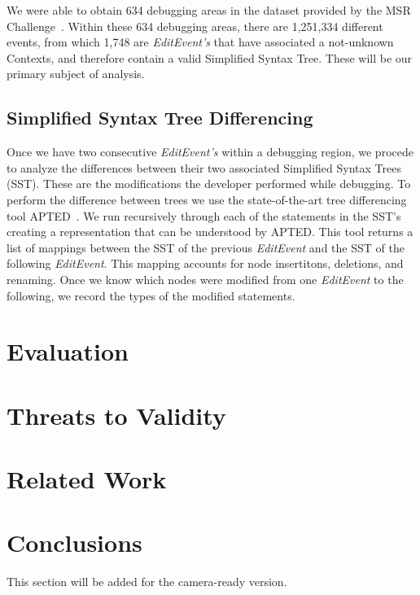 \documentclass[sigconf]{acmart}
\begin{document}
We were able to obtain 634 debugging areas in the dataset 
provided by the MSR Challenge~\cite{msr18challenge}.
Within these 634 debugging areas, there are 1,251,334
different events, from which 1,748 are \textit{EditEvent's}
that have associated a not-unknown Contexts, and therefore 
contain a valid Simplified Syntax Tree. These will be 
our primary subject of analysis.

\subsection{Simplified Syntax Tree Differencing}
Once we have two consecutive \textit{EditEvent's} within
a debugging region, we procede to analyze the differences
between their two associated Simplified Syntax Trees (SST).
These are the modifications the developer performed
while debugging.
To perform the difference between trees we use the 
state-of-the-art tree differencing
tool APTED~\cite{Pawlik16Apted}.
We run recursively through each of the statements in the 
SST's creating a representation that can be understood by
APTED. This tool returns a list of mappings between
the SST of the previous \textit{EditEvent} and the SST
of the following \textit{EditEvent}. This mapping
accounts for node insertitons, deletions, and renaming.
Once we know which nodes were modified from one \textit{EditEvent}
to the following, we record the types of the modified statements.

\section{Evaluation}

\section{Threats to Validity}

\section{Related Work}

\section{Conclusions}



\begin{acks}
 This section will be added for the camera-ready version.

\end{acks}




\end{document}
